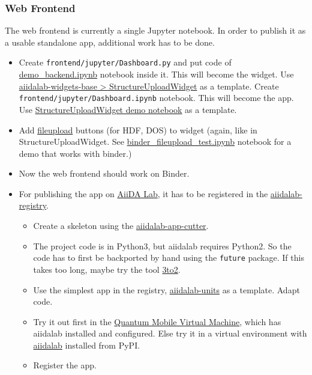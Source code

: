 \subsubsection{Web Frontend}\label{web-frontend-1}

The web frontend is currently a single Jupyter notebook. In order to
publish it as a usable standalone app, additional work has to be done.

\begin{itemize}
    \tightlist
\item
    Create \texttt{frontend/jupyter/Dashboard.py} and
    put code of
    \href{./frontend/jupyter/demo/demo_backend.ipynb}{demo\_backend.ipynb}
    notebook inside it. This will become the widget. Use 
    \href{https://github.com/aiidalab/aiidalab-widgets-base/blob/master/aiidalab_widgets_base/structures.py}{aiidalab-widgets-base
      > StructureUploadWidget} as a template. Create
    \texttt{frontend/jupyter/Dashboard.ipynb} notebook. This will become the app. Use
    \href{https://github.com/aiidalab/aiidalab-widgets-base/blob/master/structures.ipynb}{StructureUploadWidget
      demo notebook} as a template.
\item
    Add \href{https://pypi.org/project/fileupload/}{fileupload} buttons (for
    HDF, DOS) to widget
    (again, like in StructureUploadWidget. See
    \href{./frontend/jupyter/demo/binder_fileupload_test.ipynb}{binder\_fileupload\_test.ipynb}
    notebook for a demo that works with binder.)
\item
    Now the web frontend should work on Binder.
\item
    For publishing the app on \href{https://aiidalab.materialscloud.org}{AiiDA Lab}, it has to be registered in
    the
    \href{https://github.com/aiidalab/aiidalab-registry}{aiidalab-registry}.

    \begin{itemize}
        \tightlist
    \item
        Create a skeleton using the
        \href{https://github.com/aiidalab/aiidalab-app-cutter}{aiidalab-app-cutter}.
    \item
        The project code is in Python3, but aiidalab requires Python2. So
        the code has to first be backported by hand using the \texttt{future}
        package. If this takes too long, maybe try the tool
        \href{https://pypi.org/project/3to2/}{3to2}.
    \item
        Use the simplest app in the registry,
        \href{https://github.com/aiidalab/aiidalab-units}{aiidalab-units} as
        a template. Adapt code.
    \item
        Try it out first in the
        \href{https://www.materialscloud.org/work/quantum-mobile}{Quantum
          Mobile Virtual Machine}, which has aiidalab installed and
        configured. Else try it in a virtual environment with
        \href{https://pypi.org/project/aiidalab/}{aiidalab} installed from
        PyPI.
    \item
        Register the app.
    \end{itemize}
\end{itemize}

